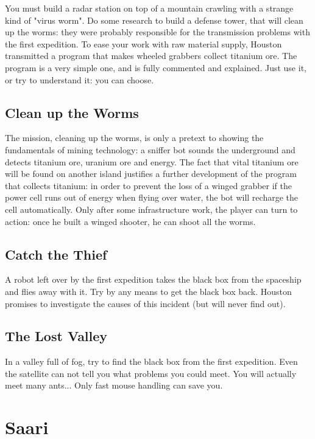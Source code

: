 You must build a radar station on top of a mountain crawling with a strange kind of "virus worm". Do some research to build a defense tower, that will clean up the worms: they were probably responsible for the transmission problems with the first expedition. To ease your work with raw material supply, Houston transmitted a program that makes wheeled grabbers collect titanium ore. The program is a very simple one, and is fully commented and explained. Just use it, or try to understand it: you can choose.


\subsection{Clean up the Worms}

The mission, cleaning up the worms, is only a pretext to showing the fundamentals of mining technology: a sniffer bot sounds the underground and detects titanium ore, uranium ore and energy. The fact that vital titanium ore will be found on another island justifies a further development of the program that collects titanium: in order to prevent the loss of a winged grabber if the power cell runs out of energy when flying over water, the bot will recharge the cell automatically. Only after some infrastructure work, the player can turn to action: once he built a winged shooter, he can shoot all the worms.


\subsection{Catch the Thief}

A robot left over by the first expedition takes the black box from the spaceship and flies away with it. Try by any means to get the black box back. Houston promises to investigate the causes of this incident (but will never find out).


\subsection{The Lost Valley}

In a valley full of fog, try to find the black box from the first expedition. Even the satellite can not tell you what problems you could meet. You will actually meet many ants... Only fast mouse handling can save you.


\newpage
\section{Saari}

